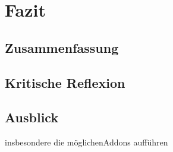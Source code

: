 \listoftodos

\chapter{Fazit}
\label{chap:Fazit}

	\section{Zusammenfassung}
	\label{sec:Zusammenfassung}
			
	\section{Kritische Reflexion}
	\label{sec:KritischeReflexion}
			
	\section{Ausblick}
	\label{sec:Ausblick}
		insbesondere die möglichenAddons aufführen


